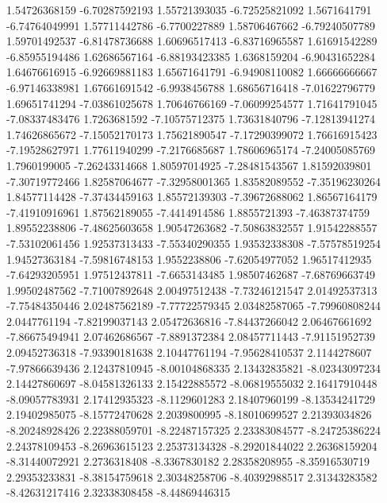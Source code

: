  1.54726368159   -6.70287592193
  1.55721393035   -6.72525821092
   1.5671641791   -6.74764049991
  1.57711442786    -6.7700227889
  1.58706467662   -6.79240507789
  1.59701492537   -6.81478736688
  1.60696517413   -6.83716965587
  1.61691542289   -6.85955194486
  1.62686567164   -6.88193423385
   1.6368159204   -6.90431652284
  1.64676616915   -6.92669881183
  1.65671641791   -6.94908110082
  1.66666666667   -6.97146338981
  1.67661691542    -6.9938456788
  1.68656716418   -7.01622796779
  1.69651741294   -7.03861025678
  1.70646766169   -7.06099254577
  1.71641791045   -7.08337483476
   1.7263681592   -7.10575712375
  1.73631840796   -7.12813941274
  1.74626865672   -7.15052170173
  1.75621890547   -7.17290399072
  1.76616915423   -7.19528627971
  1.77611940299    -7.2176685687
  1.78606965174   -7.24005085769
   1.7960199005   -7.26243314668
  1.80597014925   -7.28481543567
  1.81592039801   -7.30719772466
  1.82587064677   -7.32958001365
  1.83582089552   -7.35196230264
  1.84577114428   -7.37434459163
  1.85572139303   -7.39672688062
  1.86567164179   -7.41910916961
  1.87562189055    -7.4414914586
   1.8855721393   -7.46387374759
  1.89552238806   -7.48625603658
  1.90547263682   -7.50863832557
  1.91542288557   -7.53102061456
  1.92537313433   -7.55340290355
  1.93532338308   -7.57578519254
  1.94527363184   -7.59816748153
   1.9552238806   -7.62054977052
  1.96517412935   -7.64293205951
  1.97512437811    -7.6653143485
  1.98507462687   -7.68769663749
  1.99502487562   -7.71007892648
  2.00497512438   -7.73246121547
  2.01492537313   -7.75484350446
  2.02487562189   -7.77722579345
  2.03482587065   -7.79960808244
   2.0447761194   -7.82199037143
  2.05472636816   -7.84437266042
  2.06467661692   -7.86675494941
  2.07462686567    -7.8891372384
  2.08457711443   -7.91151952739
  2.09452736318   -7.93390181638
  2.10447761194   -7.95628410537
   2.1144278607   -7.97866639436
  2.12437810945   -8.00104868335
  2.13432835821   -8.02343097234
  2.14427860697   -8.04581326133
  2.15422885572   -8.06819555032
  2.16417910448   -8.09057783931
  2.17412935323    -8.1129601283
  2.18407960199   -8.13534241729
  2.19402985075   -8.15772470628
   2.2039800995   -8.18010699527
  2.21393034826   -8.20248928426
  2.22388059701   -8.22487157325
  2.23383084577   -8.24725386224
  2.24378109453   -8.26963615123
  2.25373134328   -8.29201844022
  2.26368159204   -8.31440072921
   2.2736318408    -8.3367830182
  2.28358208955   -8.35916530719
  2.29353233831   -8.38154759618
  2.30348258706   -8.40392988517
  2.31343283582   -8.42631217416
  2.32338308458   -8.44869446315
